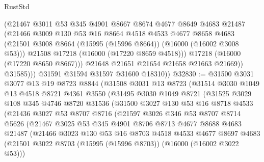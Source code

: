 \begin{lexlean}{RustStd}
\begin{coremodule}
                  (@21467
                    @3011
                    @53
                    @345
                    @4901
                    @8667
                    @8674
                    @4677
                    @8649
                    @4683
                    @21487
                    (@21466
                      @3009
                      @130
                      @53
                      @16
                      @8664
                      @4518
                      @4533
                      @4677
                      @8658
                      @4683
                      (@21501 @3008 @8664 (@15995 (@15996 @8664)) (@16000 (@16002 @3008 @53)))
                      @21508
                      @17218
                      (@16000 (@17220 @8659 @4518)))
                    @17218
                    (@16000 (@17220 @8650 @8667)))
                  @21648
                  @21651
                  @21654
                  @21658
                  @21663
                  @21669))
              @31585)))
        @31591
        @31594
        @31597
        @31600
        @18310))
@32830 := @31500
    @3031
    @3077
    @13
    @19
    @8723
    @8844
    (@31508
      @3031
      @13
      @8723
      (@31514
        @3030
        @1049
        @13
        @4518
        @8721
        @4361
        @3550
        (@31495
          @3030
          @1049
          @8721
          (@31525
            @3029
            @108
            @345
            @4746
            @8720
            @31536
            (@31500
              @3027
              @130
              @53
              @16
              @8718
              @4533
              (@21436
                @3027
                @53
                @8707
                @8716
                (@21597
                  @3026
                  @346
                  @53
                  @8707
                  @8714
                  @5626
                  (@21467
                    @3025
                    @53
                    @345
                    @4901
                    @8706
                    @8713
                    @4677
                    @8688
                    @4683
                    @21487
                    (@21466
                      @3023
                      @130
                      @53
                      @16
                      @8703
                      @4518
                      @4533
                      @4677
                      @8697
                      @4683
                      (@21501 @3022 @8703 (@15995 (@15996 @8703)) (@16000 (@16002 @3022 @53)))

\end{coremodule}
\end{lexlean}
